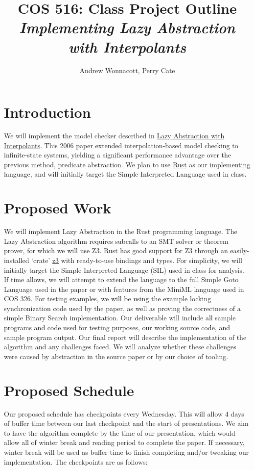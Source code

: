 \documentclass{article}
\title{COS 516: Class Project Outline \\ \emph{Implementing Lazy Abstraction with Interpolants}}
\author{Andrew Wonnacott, Perry Cate}
\begin{document}
\maketitle

\section{Introduction}
We will implement the model checker described in \href{http://citeseerx.ist.psu.edu/viewdoc/download?doi=10.1.1.84.4733&rep=rep1&type=pdf}{Lazy Abstraction with Interpolants}. This 2006 paper extended interpolation-based model checking to infinite-state systems, yielding a significant performance advantage over the previous method, predicate abstraction. We plan to use \href{https://www.rust-lang.org/en-US/}{Rust} as our implementing language, and will initially target the Simple Interpreted Language used in class.

\section{Proposed Work}
We will implement Lazy Abstraction in the Rust programming language. The Lazy Abstraction algorithm requires subcalls to an SMT solver or theorem prover, for which we will use Z3. Rust has good support for Z3 through an easily-installed `crate' \href{https://crates.io/crates/z3}{z3} with ready-to-use bindings and types.
For simplicity, we will initially target the Simple Interpreted Language (SIL) used in class for analysis. If time allows, we will attempt to extend the language to the full Simple Goto Language used in the paper or with features from the MiniML language used in COS 326.
For testing examples, we will be using the example locking synchronization code used by the paper, as well as proving the correctness of a simple Binary Search implementation.
Our deliverable will include all sample programs and code used for testing purposes, our working source code, and sample program output.
Our final report will describe the implementation of the algorithm and any challenges faced. We will analyze whether these challenges were caused by abstraction in the source paper or by our choice of tooling.

\section{Proposed Schedule}
Our proposed schedule has checkpoints every Wednesday. This will allow 4 days of buffer time between our last checkpoint and the start of presentations. We aim to have the algorithm complete  by the time of our presentation, which would allow all of winter break and reading period to complete the paper. If necessary, winter break will be used as buffer time to finish completing and/or tweaking our implementation. The checkpoints are as follows:
\end{document}
